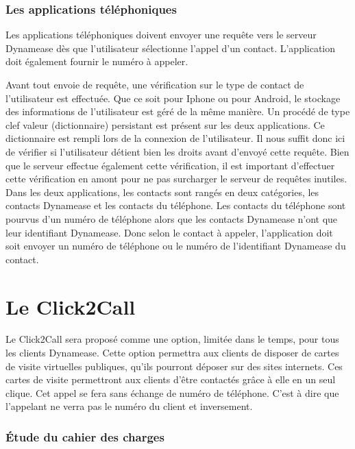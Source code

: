 \subsubsection{Les applications téléphoniques}

Les applications téléphoniques doivent envoyer une requête vers le serveur Dynamease dès que l'utilisateur sélectionne l'appel d'un contact. L'application doit également fournir le numéro à appeler.

Avant tout envoie de requête, une vérification sur le type de contact de l'utilisateur est effectuée. Que ce soit pour Iphone ou pour Android, le stockage des informations de l'utilisateur est géré de la même manière. Un procédé de type clef valeur (dictionnaire) persistant est présent sur les deux applications. Ce dictionnaire est rempli lors de la connexion de l'utilisateur. Il nous suffit donc ici de vérifier si l'utilisateur détient bien les droits avant d'envoyé cette requête. Bien que le serveur effectue également cette vérification, il est important d'effectuer cette vérification en amont pour ne pas surcharger le serveur de requêtes inutiles.\\

Dans les deux applications, les contacts sont rangés en deux catégories, les contacts Dynamease et les contacts du téléphone. Les contacts du téléphone sont pourvus d'un numéro de téléphone alors que les contacts Dynamease n'ont que leur identifiant Dynamease. Donc selon le contact à appeler, l'application doit soit envoyer un numéro de téléphone ou le numéro de l'identifiant Dynamease du contact.

\section{Le Click2Call}

Le Click2Call sera proposé comme une option, limitée dans le temps, pour tous les clients Dynamease. Cette option permettra aux clients de disposer de cartes de visite virtuelles publiques, qu'ils pourront déposer sur des sites internets. Ces cartes de visite permettront aux clients d'être contactés grâce à elle en un seul clique. Cet appel se fera sans échange de numéro de téléphone. C'est à dire que l'appelant ne verra pas le numéro du client et inversement.

\subsubsection{Étude du cahier des charges}

